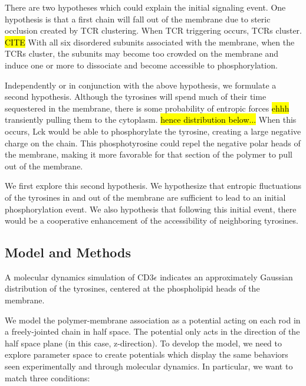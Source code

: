 \documentclass[../../AdvancementSummary.tex]{subfiles}
\begin{document}
{There are two hypotheses which could explain the initial signaling event. One hypothesis is that a first chain will fall out of the membrane due to steric occlusion created by TCR clustering. When TCR triggering occurs, TCRs cluster. \hl{CITE} With all six disordered subunits associated with the membrane, when the TCRs cluster, the subunits may become too crowded on the membrane and induce one or more to dissociate and become accessible to phosphorylation. 

Independently or in conjunction with the above hypothesis, we formulate a second hypothesis. Although the tyrosines will spend much of their time sequestered in the membrane, there is some probability of entropic forces \hl{ehhh} transiently pulling them to the cytoplasm. \hl{hence distribution below...} When this occurs, Lck would be able to phosphorylate the tyrosine, creating a large negative charge on the chain. This phosphotyrosine could repel the negative polar heads of the membrane, making it more favorable for that section of the polymer to pull out of the membrane.  

We first explore this second hypothesis. We hypothesize that entropic fluctuations of the tyrosines in and out of the membrane are sufficient to lead to an initial phosphorylation event. We also hypothesis that following this initial event, there would be a cooperative enhancement of the accessibility of neighboring tyrosines.


\subsection{Model and Methods}


A molecular dynamics simulation of CD3$\epsilon$ indicates an approximately Gaussian distribution of the tyrosines, centered at the phospholipid heads of the membrane. \cite{Lopez2015}

We model the polymer-membrane association as a potential acting on each rod in a freely-jointed chain in half space. The potential only acts in the direction of the half space plane (in this case, z-direction). To develop the model, we need to explore parameter space to create potentials which display the same behaviors seen experimentally and through molecular dynamics. In particular, we want to match three conditions:

}
\end{document}
